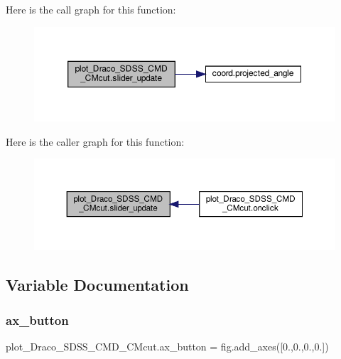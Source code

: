 Here is the call graph for this function\+:\nopagebreak
\begin{figure}[H]
\begin{center}
\leavevmode
\includegraphics[width=350pt]{d6/dab/namespaceplot__Draco__SDSS__CMD__CMcut_a9bc5b2b68855c01a286faea241fb5940_cgraph}
\end{center}
\end{figure}
Here is the caller graph for this function\+:\nopagebreak
\begin{figure}[H]
\begin{center}
\leavevmode
\includegraphics[width=350pt]{d6/dab/namespaceplot__Draco__SDSS__CMD__CMcut_a9bc5b2b68855c01a286faea241fb5940_icgraph}
\end{center}
\end{figure}


\subsection{Variable Documentation}
\mbox{\label{namespaceplot__Draco__SDSS__CMD__CMcut_a89c6fffbcf2ec676181b539218612288}} 
\subsubsection{\texorpdfstring{ax\+\_\+button}{ax\_button}}
{\footnotesize\ttfamily plot\+\_\+\+Draco\+\_\+\+S\+D\+S\+S\+\_\+\+C\+M\+D\+\_\+\+C\+Mcut.\+ax\+\_\+button = fig.\+add\+\_\+axes(\mbox{[}0.,0.,0.,0.\mbox{]})}



